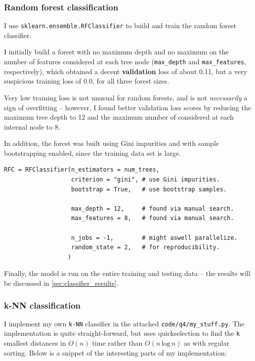 \subsubsection{Random forest classification}
\label{sec:rf}

I use \texttt{sklearn.ensemble.RFClassifier} to build and train the random
forest classifier.

I initially build a forest with no maximum depth and no maximum on the number of
features considered at each tree node (\texttt{max\_depth} and
\texttt{max\_features}, respectively), which obtained a decent
\textbf{validation} loss of about 0.11, but a very suspicious training loss of
0.0, for all three forest sizes.

Very low training loss is not unusual for random forests, and is not
\textit{necessarily} a sign of overfitting -- however, I found better validation
loss scores by reducing the maximum tree depth to 12 and the maximum number of
considered at each internal node to 8.

In addition, the forest was built using Gini impurities and with sample
bootstrapping enabled, since the training data set is large.

\begin{verbatim}
RFC = RFClassifier(n_estimators = num_trees,
                   criterion = "gini", # use Gini impurities.
                   bootstrap = True,   # use bootstrap samples.

                   max_depth = 12,     # found via manual search.
                   max_features = 8,   # found via manual search.

                   n_jobs = -1,        # might aswell parallelize.
                   random_state = 2,   # for reproducibility.
                  )
\end{verbatim}

Finally, the model is run on the entire training and testing data -- the
results will be discussed in \cref{sec:classifier_results}.

\newpage
\subsubsection{k-NN classification}
\label{sec:knn}

I implement my own \texttt{k-NN} classifier in the attached
\texttt{code/q4/my\_stuff.py}. The implementation is quite straight-forward, but
uses quickselection to find the \texttt{k} smallest distances in $O(n)$ time
rather than $O(n\, \text{log}\, n)$ as with regular sorting. Below is a snippet
of the interesting parts of my implementation:

